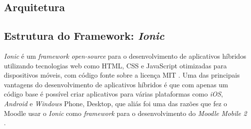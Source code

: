 %

\subsection{Arquitetura}
\subsection{Estrutura do Framework: \textit{Ionic}}

\textit{Ionic} é um \textit{framework open-source} para o desenvolvimento de aplicativos
híbridos utilizando tecnologias web como HTML,
CSS e JavaScript otimizadas
para dispositivos móveis, com código fonte sobre a licença MIT \cite{ionic2016}.
Uma das principais vantagens do desenvolvimento de aplicativos híbridos é que com
apenas um código base é possível criar aplicativos para várias plataformas como
\textit{iOS}, \textit{Android} e \textit{Windows} Phone, Desktop, que aliás foi uma das razões que fez o Moodle
usar o \textit{Ionic} como \textit{framework} para o desenvolvimento do \textit{Moodle Mobile 2} \cite{moodle2016}.

